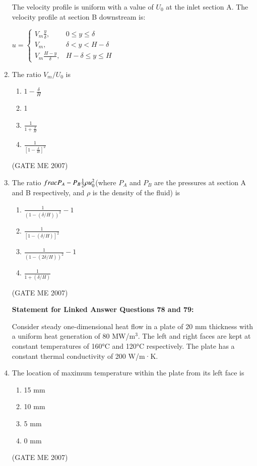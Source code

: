 \documentclass[journal]{IEEEtran}
\begin{document}
\begin{enumerate}
The velocity profile is uniform with a value of $ U_0 $ at the inlet section A.  
The velocity profile at section B downstream is:

$u =
\begin{cases}
V_m \frac{y}{\delta}, & 0 \leq y \leq \delta \\
V_m, & \delta < y < H - \delta \\
V_m \frac{H - y}{\delta}, & H - \delta \leq y \leq H
\end{cases}
$

\item The ratio $ V_m / U_0 $ is
\begin{multicols}{2}
\begin{enumerate}
\item $ 1 - \frac{\delta}{H} $
\item 1
\item $ \frac{1}{1 + \frac{\delta}{H}} $
\item $ \frac{1}{[1 - \frac{\delta}{H}]^2} $
\end{enumerate}
\end{multicols}
\hfill (GATE ME 2007)

\item The ratio $\\frac{P_A - P_B}{\frac{1}{2} \rho u_0^2}$(where $ P_A $ and $ P_B $ are the pressures at section A and B respectively, and $ \rho $ is the density of the fluid) is
\begin{multicols}{2}
\begin{enumerate}
\item $ \frac{1}{(1 - (\delta / H))^2} - 1 $
\item $ \frac{1}{[1 - (\delta / H)]^2} $
\item $ \frac{1}{(1 - (2\delta / H))^2} - 1 $
\item $ \frac{1}{1 + (\delta / H)} $
\end{enumerate}
\end{multicols}
\hfill (GATE ME 2007)

\textbf{Statement for Linked Answer Questions 78 and 79:} 

Consider steady one-dimensional heat flow in a plate of 20 mm thickness with a uniform heat generation of 80 MW/m$^3$. The left and right faces are kept at constant temperatures of 160°C and 120°C respectively. The plate has a constant thermal conductivity of 200 W/m·K.

\item The location of maximum temperature within the plate from its left face is
\begin{multicols}{4}
\begin{enumerate}
\item 15 mm
\item 10 mm
\item 5 mm
\item 0 mm
\end{enumerate}
\end{multicols}
\hfill (GATE ME 2007)


\end{enumerate}
\end{document}
